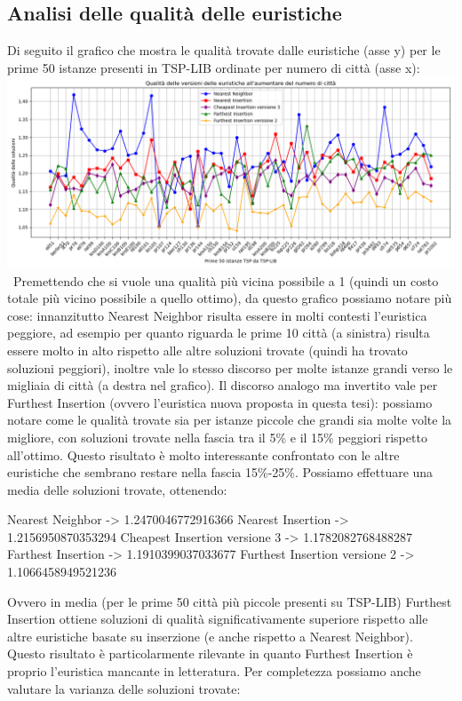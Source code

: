 \documentclass[a4paper,12pt]{report}
\begin{document}
\subsection{Analisi delle qualità delle euristiche}
Di seguito il grafico che mostra le qualità trovate dalle euristiche (asse y) per le prime 50 istanze presenti in TSP-LIB ordinate per numero di città (asse x): \newline
\includegraphics[width=1\textwidth]{../Grafici/7.png} \
Premettendo che si vuole una qualità più vicina possibile a 1 (quindi un costo totale più vicino possibile a quello ottimo), da questo grafico possiamo notare più cose: innanzitutto Nearest Neighbor risulta essere in molti contesti l'euristica peggiore, ad esempio per quanto riguarda le prime 10 città (a sinistra) risulta essere molto in alto rispetto alle altre soluzioni trovate (quindi ha trovato soluzioni peggiori), inoltre vale lo stesso discorso per molte istanze grandi verso le migliaia di città (a destra nel grafico). Il discorso analogo ma invertito vale per Furthest Insertion (ovvero l'euristica nuova proposta in questa tesi): possiamo notare come le qualità trovate sia per istanze piccole che grandi sia molte volte la migliore, con soluzioni trovate nella fascia tra il 5\% e il 15\% peggiori rispetto all'ottimo. Questo risultato è molto interessante confrontato con le altre euristiche che sembrano restare nella fascia 15\%-25\%. Possiamo effettuare una media delle soluzioni trovate, ottenendo:
\begin{myverbatim}
Nearest Neighbor ->              1.2470046772916366
Nearest Insertion ->             1.2156950870353294
Cheapest Insertion versione 3 -> 1.1782082768488287
Farthest Insertion ->            1.1910399037033677
Furthest Insertion versione 2 -> 1.1066458949521236
\end{myverbatim}
Ovvero in media (per le prime 50 città più piccole presenti su TSP-LIB) Furthest Insertion ottiene soluzioni di qualità significativamente superiore rispetto alle altre euristiche basate su inserzione (e anche rispetto a Nearest Neighbor). Questo risultato è particolarmente rilevante in quanto Furthest Insertion è proprio l'euristica mancante in letteratura. Per completezza possiamo anche valutare la varianza delle soluzioni trovate:
\end{document}
